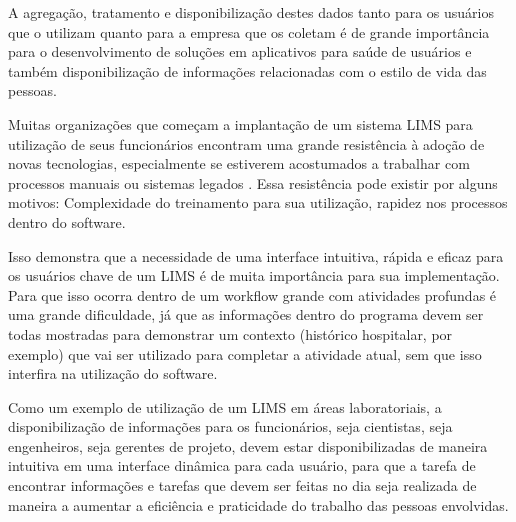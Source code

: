 A agregação, tratamento e disponibilização destes dados tanto para os usuários que o utilizam quanto para a empresa que os coletam é de grande importância para o desenvolvimento de soluções em aplicativos para saúde de usuários e também disponibilização de informações relacionadas com o estilo de vida das pessoas.


Muitas organizações que começam a implantação de um sistema LIMS para utilização de seus funcionários encontram uma grande resistência à adoção de novas tecnologias, especialmente se estiverem acostumados a trabalhar com processos manuais ou sistemas legados \R. Essa resistência pode existir por alguns motivos: Complexidade do treinamento para sua utilização, rapidez nos processos dentro do software.

Isso demonstra que a necessidade de uma interface intuitiva, rápida e eficaz para os usuários chave de um LIMS é de muita importância para sua implementação. Para que isso ocorra dentro de um workflow grande com atividades profundas é uma grande dificuldade, já que as informações dentro do programa devem ser todas mostradas para demonstrar um contexto (histórico hospitalar, por exemplo) que vai ser utilizado para completar a atividade atual, sem que isso interfira na utilização do software.


Como um exemplo de utilização de um LIMS em áreas laboratoriais, a disponibilização de informações para os funcionários, seja cientistas, seja engenheiros, seja gerentes de projeto, devem estar disponibilizadas de maneira intuitiva em uma interface dinâmica para cada usuário, para que a tarefa de encontrar informações e tarefas que devem ser feitas no dia seja realizada de maneira a aumentar a eficiência e praticidade do trabalho das pessoas envolvidas.